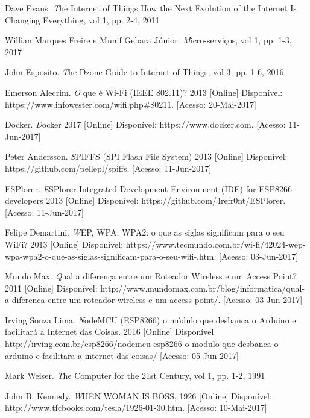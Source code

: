 \documentclass[journal]{IEEEtran}
\begin{document}
\begin{thebibliography}{1}

Dave Evans. \emph The Internet of Things How the Next Evolution of the Internet Is Changing Everything, vol 1, pp. 2-4, 2011

Willian Marques Freire e Munif Gebara Júnior. \emph Micro-serviços, vol 1, pp. 1-3, 2017

John Esposito. \emph The Dzone Guide to Internet of Things, vol 3, pp. 1-6, 2016

Emerson Alecrim. \emph O que é Wi-Fi (IEEE 802.11)? 2013 [Online] Disponível: https://www.infowester.com/wifi.php\#80211. [Acesso: 20-Mai-2017]

Docker. \emph Docker 2017 [Online] Disponível: https://www.docker.com. [Acesso: 11-Jun-2017]

Peter Andersson. \emph SPIFFS (SPI Flash File System) 2013 [Online] Disponível: https://github.com/pellepl/spiffs. [Acesso: 11-Jun-2017]

ESPlorer. \emph ESPlorer Integrated Development Environment (IDE) for ESP8266 developers 2013 [Online] Disponível: https://github.com/4refr0nt/ESPlorer. [Acesso: 11-Jun-2017]

Felipe Demartini. \emph WEP, WPA, WPA2: o que as siglas significam para o seu WiFi? 2013 [Online] Disponível: https://www.tecmundo.com.br/wi-fi/42024-wep-wpa-wpa2-o-que-as-siglas-significam-para-o-seu-wifi-.htm. [Acesso: 03-Jun-2017]

Mundo Max. \emph Qual a diferença entre um Roteador Wireless e um Access Point? 2011 [Online] Disponível: http://www.mundomax.com.br/blog/informatica/qual-a-diferenca-entre-um-roteador-wireless-e-um-access-point/. [Acesso: 03-Jun-2017]

Irving Souza Lima. \emph NodeMCU (ESP8266) o módulo que desbanca o Arduino e facilitará a Internet das Coisas. 2016 [Online] Disponível
http://irving.com.br/esp8266/nodemcu-esp8266-o-modulo-que-desbanca-o-arduino-e-facilitara-a-internet-das-coisas/ [Acesso: 05-Jun-2017]

Mark Weiser. \emph The Computer for the 21st Century, vol 1, pp. 1-2, 1991

John B. Kennedy. \emph WHEN WOMAN IS BOSS, 1926 [Online] Disponível: http://www.tfcbooks.com/tesla/1926-01-30.htm. [Acesso: 10-Mai-2017]


\end{thebibliography}
\end{document}
